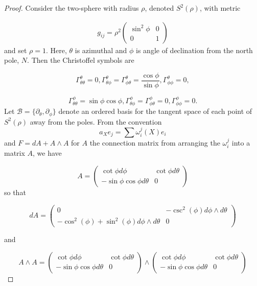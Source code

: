 \documentclass{amsart}
\begin{document}
\begin{proof}

Consider the two-sphere with radius $\rho$, denoted $S^2(\rho)$, with metric 

\begin{align*} g_{ij} = \rho^2 \left(\begin{matrix} \sin^2\phi & 0 \\ 0 & 1 \end{matrix} \right)\end{align*} and set $\rho=1$. Here, $\theta$ is azimuthal and $\phi$ is angle of declination from the north pole, $N$. Then the Christoffel symbols are 

$$\Gamma_{\theta\theta}^\theta = 0, \Gamma_{\theta\phi}^\theta=\Gamma_{\phi\theta}^\theta=\frac{\cos\phi}{\sin\phi}, \Gamma_{\phi\phi}^\theta=0,$$

$$\Gamma_{\theta\theta}^\phi = \sin\phi\cos\phi, \Gamma_{\theta\phi}^\phi=\Gamma_{\phi\theta}^\phi=0, \Gamma_{\phi\phi}^\phi=0.$$ Let $ \mathcal{B} = \{\partial_\theta, \partial_\phi\}$ denote an ordered basis for the tangent space of each point of $S^2(\rho)$ away from the poles. From the convention $$a_X e_j = \sum \omega_i^j(X) e_i$$ and $F = dA + A \wedge A$ for $A$ the connection matrix from arranging the $\omega_i^j$ into a matrix $A$, we have 


$$A = \left( \begin{matrix} \cot\phi d\phi & \cot\phi d\theta \\ -\sin\phi\cos\phi d\theta & 0 \end{matrix} \right) $$ so that 

$$dA = \left(\begin{matrix} 0 & -\csc^2(\phi) d\phi \wedge d\theta \\ -\cos^2(\phi) + \sin^2(\phi) d\phi \wedge d\theta & 0 \end{matrix}\right) $$

and

$$ A \wedge A = \left( \begin{matrix} \cot\phi d\phi & \cot\phi d\theta \\ -\sin\phi\cos\phi d\theta & 0 \end{matrix} \right) \wedge \left( \begin{matrix} \cot\phi d\phi & \cot\phi d\theta \\ -\sin\phi\cos\phi d\theta & 0 \end{matrix} \right) $$


\end{proof}
\end{document}
